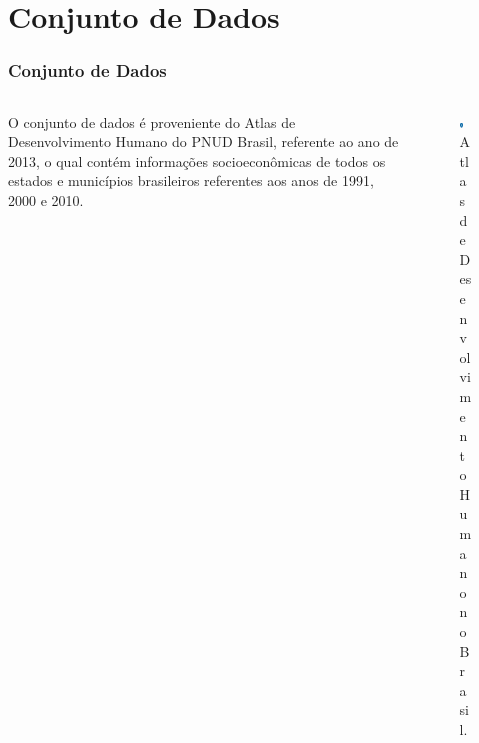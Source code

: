 \documentclass[aspectratio=169]{beamer}
\begin{document}
\section{Conjunto de Dados}
\begin{frame}
\frametitle{Conjunto de Dados}
\justifying

\begin{columns}
\begin{column}{0.5\textwidth}


O conjunto de dados é proveniente do Atlas de Desenvolvimento Humano do PNUD Brasil, referente ao ano de 2013, o qual contém informações socioeconômicas de todos os estados e municípios brasileiros referentes aos anos de 1991, 2000 e 2010.

\end{column}

\begin{column}{0.4\textwidth}

\begin{figure}
\centering
\includegraphics[width=0.3\textwidth]{images/atlas.png}
\caption{Atlas de Desenvolvimento Humano no Brasil.}
\end{figure}


\end{column}
\end{columns}


\end{frame}
\end{document}
